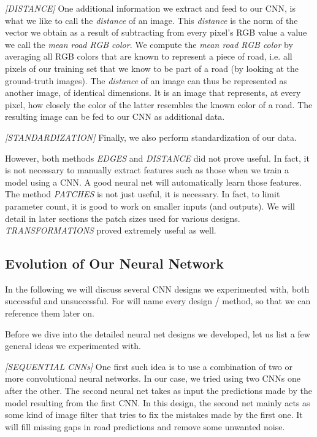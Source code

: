 \documentclass[10pt,conference,compsocconf]{IEEEtran}
\begin{document}
\textit{[DISTANCE]}   
One additional information we extract and feed to our CNN, is what we like to call the \textit{distance} of an image. This  \textit{distance} is the norm of the vector we obtain as a result of subtracting from every pixel's RGB value a value we call the \textit{mean road RGB color}. We compute the \textit{mean road RGB color} by averaging all RGB colors that are known to represent a piece of road, i.e. all pixels of our training set that we know to be part of a road (by looking at the ground-truth images). The \textit{distance} of an image can thus be represented as another image, of identical dimensions. It is an image that represents, at every pixel, how closely the color of the latter resembles the known color of a road. The resulting image can be fed to our CNN as additional data.

\textit{[STANDARDIZATION]}   
Finally, we also perform standardization of our data. 


However, both methods \textit{EDGES} and \textit{DISTANCE} did not prove useful. In fact, it is not necessary to manually extract features such as those when we train a model using a CNN. A good neural net will automatically learn those features. The method \textit{PATCHES} is not just useful, it is necessary. In fact, to limit parameter count, it is good to work on smaller inputs (and outputs). We will detail in later sections the patch sizes used for various designs. \textit{TRANSFORMATIONS} proved extremely useful as well.



\subsection{Evolution of Our Neural Network} 
\label{ssec:technique}

In the following we will discuss several CNN designs we experimented with, both successful and unsuccessful. For will name every design / method, so that we can reference them later on.

Before we dive into the detailed neural net designs we developed, let us list a few general ideas we experimented with.

\textit{[SEQUENTIAL CNNs]}  
 One first such idea is to use a combination of two or more convolutional neural networks. In our case, we tried using two CNNs one after the other. The second neural net takes as input the predictions made by the model resulting from the first CNN. In this design, the second net mainly acts as some kind of image filter that tries to fix the mistakes made by the first one. It will fill missing gaps in road predictions and remove some unwanted noise.
\end{document}
